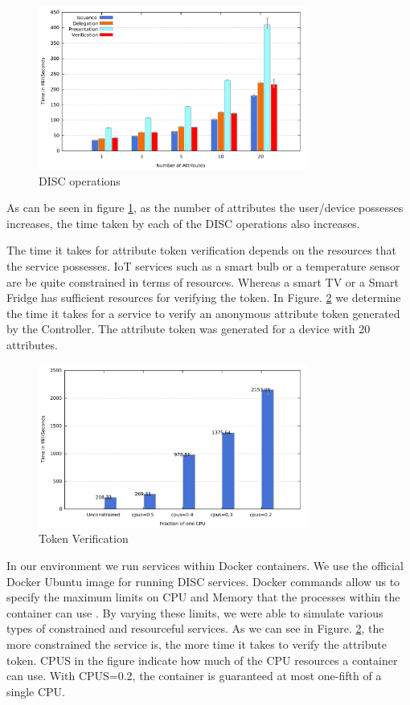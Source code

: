 \documentclass[journal]{IEEEtran}
\begin{document}
\begin{figure}[htbp]
\centerline{\includegraphics[width=3.5in]{operations.pdf}}
\caption{DISC operations}
\label{fig:disc_op}
\end{figure}

As can be seen in figure \ref{fig:disc_op}, as the number of attributes the user/device possesses increases, the time taken by each of the DISC operations also increases.

The time it takes for attribute token verification depends on the resources that the service possesses. IoT services such as a smart bulb or a temperature sensor are be quite constrained in terms of resources. Whereas a smart TV or a Smart Fridge has sufficient resources for verifying the token. In Figure. \ref{fig:token_ver} we determine the time it takes for a service to verify an anonymous attribute token generated by the Controller. The attribute token was generated for a device with 20 attributes.

\begin{figure}[htbp]
\centerline{\includegraphics[width=3.5in]{verification.pdf}}
\caption{Token Verification}
\label{fig:token_ver}
\end{figure}

In our environment we run services within Docker containers. We use the official Docker Ubuntu image \cite{docker} for running DISC services. Docker commands allow us to specify the maximum limits on CPU and Memory that the processes within the container can use \cite{cpu}. By varying these limits, we were able to simulate various types of constrained and resourceful services. As we can see in Figure. \ref{fig:token_ver}, the more constrained the service is, the more time it takes to verify the attribute token. CPUS in the figure indicate how much of the CPU resources a container can use. With CPUS=0.2, the container is guaranteed at most one-fifth of a single CPU.
\end{document}
